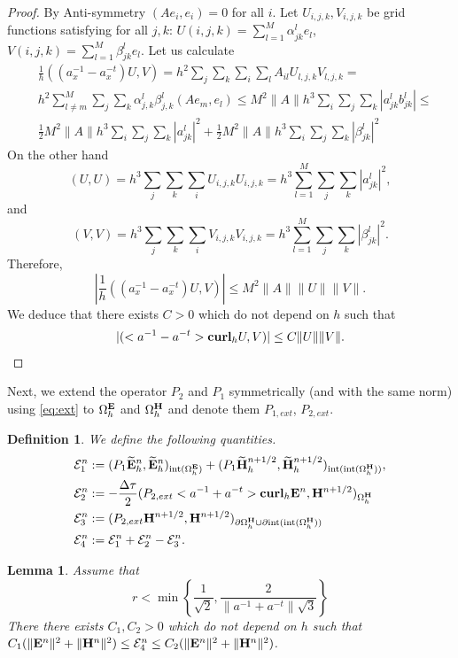 \documentclass[12pt,reqno]{amsart}
\newcommand{\curl}{{\bf curl}}
\newcommand{\e}{{\bf E}}
\newcommand{\h}{{\bf H}}
\newtheorem{lem}[theorem]{Lemma}
\newtheorem{defi}[theorem]{Definition}
\theoremstyle{definition}
\numberwithin{equation}{section}
\newcommand{\intr}[1]{\mathrm{int}(#1)}
\def\Gwh{\Omega_h}
\begin{document}
\begin{proof}
By Anti-symmetry  $(Ae_i,e_i)=0$ for all $i$.
  Let $U_{i,j,k}, V_{i,j,k}$ be grid functions satisfying for all $j,k$:
  $U(i,j,k)=\sum_{l=1}^M \alpha_{jk}^{l}e_l$, $V(i,j,k)=\sum_{l=1}^M \beta_{jk}^{l}e_l$.
Let us calculate
  \begin{align*}
  	&
 \frac{1}{h}((a_x^{-1}-a_x^{-t})U,V)=h^2 \sum_j\sum_k\sum_i\sum_l A_{il}U_{l,j,k}V_{l,j,k}=\\&
 h^2\sum_{l\neq m}^M\sum_j\sum_k\alpha_{j,k}^l\beta_{j,k}^l(Ae_m,e_l)\leq 
 M^2\|A\|h^3\sum_{i}\sum_j\sum_k |a_{jk}^lb_{jk}^l|\leq \\&
  \frac{1}{2}M^2\|A\|h^3\sum_{i}\sum_j\sum_k |a_{jk}^l|^2
  +  \frac{1}{2}M^2\|A\|h^3\sum_{i}\sum_j\sum_k |\beta_{jk}^l|^2
  \end{align*}
On the other hand 
$$
(U,U)=h^3\sum_j\sum_k\sum_i U_{i,j,k}U_{i,j,k}=h^3\sum_{l=1}^M\sum_j\sum_k |a_{jk}^l|^2,
$$
and 
$$
(V,V)=h^3\sum_j\sum_k\sum_i V_{i,j,k}V_{i,j,k}=h^3\sum_{l=1}^M\sum_j\sum_k|\beta_{jk}^l|^2.
$$
Therefore,
$$
| \frac{1}{h}((a_x^{-1}-a_x^{-t})U,V)|\leq M^2\|A\|\|U\|\|V\|.
$$
We deduce that
 there exists $C>0$ which do not depend on $h$ such that
\begin{align}
|	(<a^{-1}-a^{-t}>\curl_h U,V)|\leq C\|U\| \|V\|.
\end{align}
% 
\end{proof}

		Next, we extend the operator $P_2$ and $P_1$ symmetrically (and with the same norm) using \eqref{eq:ext}  to $\Gwh^{\e}$ and 
$\Gwh^{\h}$ and denote them $P_{1,ext}$, $P_{2,ext}$.
\begin{defi}

	We define the following quantities.
	\begin{align*}
		&
		\mathcal{E}_1^{n}:=
		(P_1\widetilde{\e}_h^{n},\widetilde{\e}_h^{n})_{\intr{\Gwh^\e}}+
		(P_1\widetilde{\h}_h^{n+1/2},\widetilde{\h}_h^{n+1/2})_{\intr{\intr{\Gwh^\h}}}, \\&
		\mathcal{E}_2^{n}:=-\frac{\Delta \tau}{2}(P_{2,ext}<a^{-1}+a^{-t}>\curl_h \e^{n},\h^{n+1/2})_{\Gwh^\h}\\&
		\mathcal{E}_3^{n}:=(P_{2,ext}\h^{n+1/2},\h^{n+1/2})_{\partial \Gwh^\h\cup \partial \intr{\intr{\Gwh^\h}}}\\&
		\mathcal{E}_4^{n}:=\mathcal{E}^n_1+\mathcal{E}^n_2-\mathcal{E}^n_3.
	\end{align*}
\end{defi}
\begin{lem}\label{lem:first}
	Assume that 
	\begin{equation}\label{eq:cfl}
	r<\min \left \{  \frac{1}{\sqrt{2}},\frac{2}{\|a^{-1}+a^{-t}\|\sqrt{3}}  \right \}
	\end{equation}
	There there exists $C_1,C_2>0$ which do not depend on $h$ such that  
	$ C_1(\|\e^n\|^2+\|\h^n\|^2)\leq \mathcal{E}_4^n\leq C_2(\|\e^n\|^2+\|\h^n\|^2) $.
\end{lem}
\end{document}
